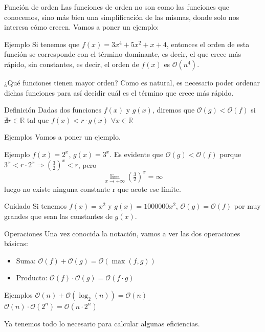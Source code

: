 \documentclass[compress]{beamer}
\begin{document}
\begin{frame}{Función de orden}
Las funciones de orden no son como las funciones que conocemos, sino más bien una simplificación de las mismas, donde solo nos interesa cómo crecen. Vamos a poner un ejemplo:
	\begin{exampleblock}{Ejemplo}
	Si tenemos que $f(x) = 3x^4 + 5x^2 + x + 4$, entonces el orden de esta función se corresponde con el término dominante, es decir, el que crece más rápido, sin constantes, es decir, el orden de $f(x)$ es $\mathcal{O}(n^4)$.
	\end{exampleblock}
\end{frame}

\begin{frame}{¿Qué funciones tienen mayor orden?}
Como es natural, es necesario poder ordenar dichas funciones para así decidir cuál es el término que crece más rápido.\\
\vspace{0.20in}
	\begin{block}{Definición}
	Dadas dos funciones $f(x)$ y $g(x)$, diremos que $\mathcal{O}(g) < \mathcal{O}(f)$ si $\nexists r\in \mathbb{R}$ tal que $f(x) < r\cdot g(x)$ $\forall x\in \mathbb{R}$
	\end{block}
\end{frame}

\begin{frame}{Ejemplos}
Vamos a poner un ejemplo.\\
\vspace{0.20in}
	\begin{exampleblock}{Ejemplo}
	$f(x) = 2^x$, $g(x) = 3^x$. Es evidente que $\mathcal{O}(g) < \mathcal{O}(f)$ porque $3^x < r\cdot2^x \Rightarrow (\tfrac{3}{2})^x < r$, pero \[\lim_{x \to +\infty}(\tfrac{3}{2})^x = \infty\]luego  no existe ninguna constante r que acote ese límite.
	\end{exampleblock}

	\begin{alertblock}{Cuidado}
	Si tenemos $f(x) = x^2$ y $g(x) = 1000000x^2$, $\mathcal{O}(g) = \mathcal{O}(f)$ por muy grandes que sean las constantes de $g(x)$.
	\end{alertblock}
\end{frame}

\begin{frame}{Operaciones}
Una vez conocida la notación, vamos a ver las dos operaciones básicas:
	\begin{itemize}
	\item Suma: $\mathcal{O}(f) + \mathcal{O}(g) = \mathcal{O}(\max(f,g))$
	\item Producto: $\mathcal{O}(f) \cdot \mathcal{O}(g) = \mathcal{O}(f\cdot g)$
	\end{itemize}

	\begin{exampleblock}{Ejemplos}
	$\mathcal{O}(n) + \mathcal{O}(\log_2(n)) = \mathcal{O}(n)$\\
	$\mathcal{O}(n) \cdot \mathcal{O}(2^n) = \mathcal{O}(n\cdot2^n)$
	\end{exampleblock}
\vspace{0.20in}
Ya tenemos todo lo necesario para calcular algunas eficiencias.
\end{frame}
\end{document}
